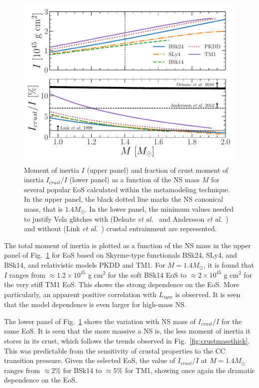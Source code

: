 \begin{figure}[!t]
\begin{center}
  \includegraphics[width=0.9\linewidth]{figures/moi_popular.pdf}
\end{center}
\caption[Moment of inertia and fraction of crust moment of inertia
versus neutron star mass for several popular equations of state]{Moment of
  inertia $I$ (upper panel) and fraction of crust moment of inertia
  $I_{crust}/I$ (lower panel) as a function of the NS mass $M$ for several 
  popular EoS calculated within the metamodeling technique. In the upper panel, 
  the black dotted line marks the NS canonical mass, that is $1.4M_\odot$. In
the lower panel, the minimum values needed to justify Vela glitches with
(Delsate \textit{et al.}~\cite{Delsate2016} and Andersson \textit{et
al.}~\cite{Andersson2012}) and without (Link \textit{et al.}~\cite{Link1999}) 
crustal entrainment are represented.}\label{fig:moi_popular}
\end{figure}

The total moment of inertia is plotted as a function of the NS mass in the
upper panel of Fig.~\ref{fig:moi_popular} for EoS based on Skyrme-type
functionals BSk24, SLy4, and BSk14, and relativistic models PKDD and TM1.
For $M=1.4M_\odot$, it is found that $I$ ranges from $\approx 1.2\times 
10^{45}$ g cm$^2$ for the soft BSk14 EoS to $\approx 2\times 10^{45}$ g cm$^2$ 
for the very stiff TM1 EoS. This shows the strong dependence on the EoS. More 
particularly, an apparent positive correlation with $L_{sym}$ is observed. 
It is seen that the model dependence is even larger for high-mass NS.

The lower panel of Fig.~\ref{fig:moi_popular} shows the variation with NS mass
of $I_{crust}/I$ for the same EoS. It is seen that the more massive a 
NS is, the less moment of inertia it stores in its crust, which follows
the trends observed in Fig.~\ref{fig:crustmassthick}. This was predictable from 
the sensitivity of crustal properties to the CC transition pressure. Given the 
selected EoS, the value of $I_{crust}/I$ at $M=1.4M_\odot$ 
ranges from $\approx 2\%$ for BSk14 to $\approx 5\%$ for TM1, showing once 
again the dramatic dependence on the EoS.

